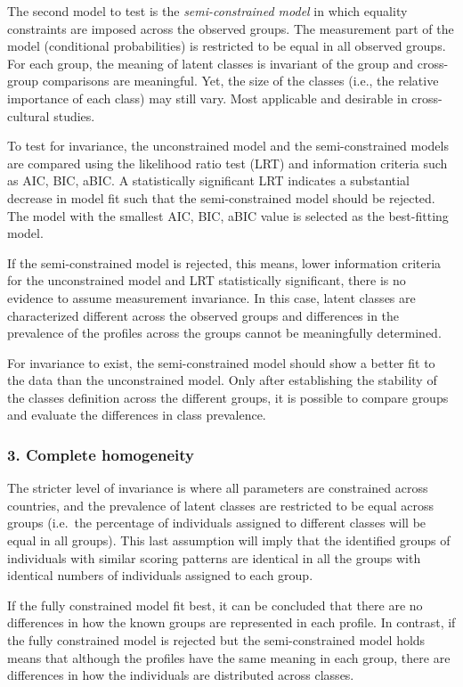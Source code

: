 \documentclass[12pt,a4paper,oneside]{reedthesis}
\begin{document}
The second model to test is the \emph{semi-constrained model} in which equality constraints are imposed across the observed groups. The measurement part of the model (conditional probabilities) is restricted to be equal in all observed groups. For each group, the meaning of latent classes is invariant of the group and cross-group comparisons are meaningful. Yet, the size of the classes (i.e., the relative importance of each class) may still vary. Most applicable and desirable in cross-cultural studies.

To test for invariance, the unconstrained model and the semi-constrained models are compared using the likelihood ratio test (LRT) and information criteria such as AIC, BIC, aBIC. A statistically significant LRT indicates a substantial decrease in model fit such that the semi-constrained model should be rejected. The model with the smallest AIC, BIC, aBIC value is selected as the best-fitting model.

If the semi-constrained model is rejected, this means, lower information criteria for the unconstrained model and LRT statistically significant, there is no evidence to assume measurement invariance. In this case, latent classes are characterized different across the observed groups and differences in the prevalence of the profiles across the groups cannot be meaningfully determined.

For invariance to exist, the semi-constrained model should show a better fit to the data than the unconstrained model. Only after establishing the stability of the classes definition across the different groups, it is possible to compare groups and evaluate the differences in class prevalence.

\hypertarget{complete-homogeneity}{%
\subsubsection{3. Complete homogeneity}\label{complete-homogeneity}}

The stricter level of invariance is where all parameters are constrained across countries, and the prevalence of latent classes are restricted to be equal across groups (i.e.~the percentage of individuals assigned to different classes will be equal in all groups). This last assumption will imply that the identified groups of individuals with similar scoring patterns are identical in all the groups with identical numbers of individuals assigned to each group.

If the fully constrained model fit best, it can be concluded that there are no differences in how the known groups are represented in each profile. In contrast, if the fully constrained model is rejected but the semi-constrained model holds means that although the profiles have the same meaning in each group, there are differences in how the individuals are distributed across classes.
\end{document}
